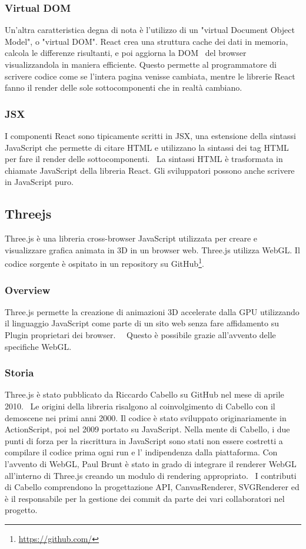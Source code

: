 \subsubsection{Virtual DOM}
Un'altra caratteristica degna di nota è l'utilizzo di un "virtual Document Object Model", o "virtual DOM".
React crea una struttura cache dei dati in memoria, calcola le differenze risultanti, e poi aggiorna
la DOM~\cite{reactdom} del browser visualizzandola in maniera efficiente.
Questo permette al programmatore di scrivere codice come se
l'intera pagina venisse cambiata, mentre le librerie React fanno il render delle sole sottocomponenti che in realtà cambiano.

\subsubsection{JSX}
I componenti React sono tipicamente scritti in JSX, una estensione della sintassi JavaScript che permette di citare
HTML e utilizzano la sintassi dei tag HTML per fare  il render delle sottocomponenti.~\cite{jsx}
La sintassi HTML è trasformata in chiamate JavaScript
della libreria React. Gli sviluppatori possono anche scrivere in JavaScript puro.


\newpage
\subsection{Threejs}
\label{sec:chapter_2_section_3_sub_2}
Three.js \`e una libreria cross-browser JavaScript utilizzata per creare e visualizzare grafica animata in 3D
in un browser web. Three.js utilizza WebGL. Il codice sorgente è ospitato in un repository su GitHub\footnote{\url{https://github.com/}}.

\subsubsection{Overview}
Three.js permette la creazione di animazioni 3D accelerate dalla GPU utilizzando il linguaggio JavaScript
come parte di un sito web senza fare affidamento su Plugin proprietari dei browser.~\cite{O3D}~\cite{unity}
 Questo è possibile grazie all'avvento delle specifiche WebGL.~\cite{khronos}

\subsubsection{Storia}
Three.js è stato pubblicato da Riccardo Cabello su GitHub nel mese di aprile 2010.~\cite{Firstcommit}
Le origini della libreria risalgono al coinvolgimento di Cabello con il demoscene nei primi anni 2000.
Il codice \`e stato sviluppato originariamente in ActionScript, poi nel 2009 portato su JavaScript. Nella mente di Cabello,
i due punti di forza per la riscrittura in JavaScript sono stati non essere costretti a compilare il codice prima
ogni run e l' indipendenza dalla piattaforma. Con l'avvento di WebGL, Paul Brunt è stato in grado di integrare il renderer
WebGL all'interno di Three.js creando un modulo di rendering appropriato.~\cite{develop}
I contributi di Cabello comprendono la progettazione API, CanvasRenderer, SVGRenderer ed è il
responsabile per la gestione dei commit da parte dei vari collaboratori nel progetto.

